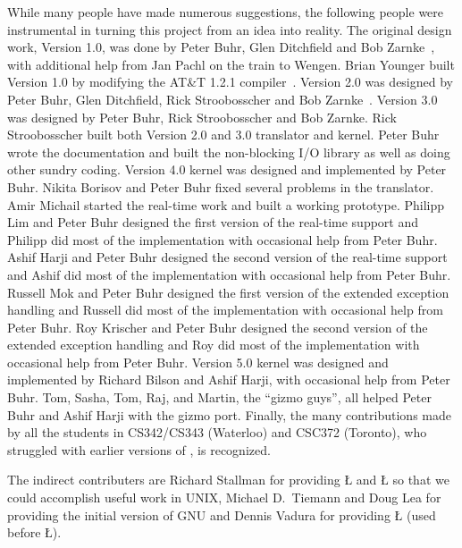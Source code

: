\documentclass[openright,twoside]{report}
\begin{document}
While many people have made numerous suggestions, the following people were instrumental in turning this project from an idea into reality.
The original design work, Version 1.0, was done by Peter Buhr, Glen Ditchfield and Bob Zarnke~\cite{Buhr89b}, with additional help from Jan Pachl on the train to Wengen.
Brian Younger built Version 1.0 by modifying the AT\&T 1.2.1 \CC compiler~\cite{Younger91}.
Version 2.0 was designed by Peter Buhr, Glen Ditchfield, Rick Stroobosscher and Bob Zarnke~\cite{Buhr92a}.
Version 3.0 was designed by Peter Buhr, Rick Stroobosscher and Bob Zarnke.
Rick Stroobosscher built both Version 2.0 and 3.0 translator and kernel.
Peter Buhr wrote the documentation and built the non-blocking I/O library as well as doing other sundry coding.
Version 4.0 kernel was designed and implemented by Peter Buhr.
Nikita Borisov and Peter Buhr fixed several problems in the translator.
Amir Michail started the real-time work and built a working prototype.
Philipp Lim and Peter Buhr designed the first version of the real-time support and Philipp did most of the implementation with occasional help from Peter Buhr.
Ashif Harji and Peter Buhr designed the second version of the real-time support and Ashif did most of the implementation with occasional help from Peter Buhr.
Russell Mok and Peter Buhr designed the first version of the extended exception handling and Russell did most of the implementation with occasional help from Peter Buhr.
Roy Krischer and Peter Buhr designed the second version of the extended exception handling and Roy did most of the implementation with occasional help from Peter Buhr.
Version 5.0 kernel was designed and implemented by Richard Bilson and Ashif Harji, with occasional help from Peter Buhr.
Tom, Sasha, Tom, Raj, and Martin, the ``gizmo guys'', all helped Peter Buhr and Ashif Harji with the gizmo port.
Finally, the many contributions made by all the students in CS342/CS343 (Waterloo) and CSC372 (Toronto), who struggled with earlier versions of \uC, is recognized.

The indirect contributers are Richard Stallman for providing \LGinlinetrue\LGbegin\lgrinde\L{}\endlgrinde\LGend{} and \LGinlinetrue\LGbegin\lgrinde\L{}\endlgrinde\LGend{} so that we could accomplish useful work in UNIX, Michael D.~Tiemann and Doug Lea for providing the initial version of GNU \CC and Dennis Vadura for providing \LGinlinetrue\LGbegin\lgrinde\L{}\endlgrinde\LGend{} (used before \LGinlinetrue\LGbegin\lgrinde\L{}\endlgrinde\LGend{}).
\end{document}
